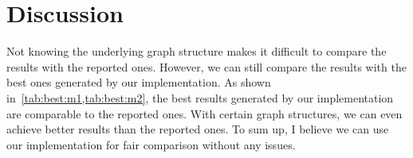 \documentclass[a4paper,10pt,conference]{IEEEtran}
\begin{document}
\begin{minipage}{0.47\linewidth}
	\begin{table}[H]
		\centering{}
		\caption{Best Comparison of \(\mathcal{M}_2\)}\label{tab:best:m2}
	\end{table}
\end{minipage}

\section{Discussion}
Not knowing the underlying graph structure makes it difficult to compare the results with the reported ones. However, we can still compare the results with the best ones generated by our implementation. As shown in~\cref{tab:best:m1,tab:best:m2}, the best results generated by our implementation are comparable to the reported ones. With certain graph structures, we can even achieve better results than the reported ones. To sum up, I believe we can use our implementation for fair comparison without any issues.

\printbibliography{}
\end{document}
